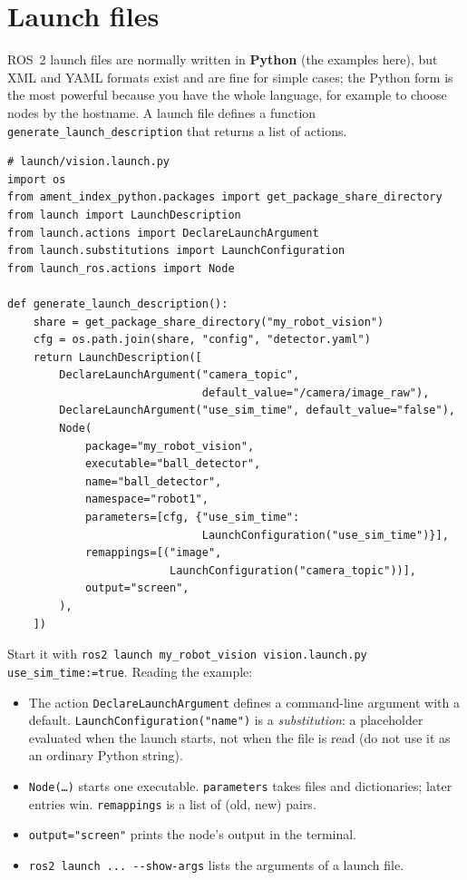 \section*{Launch files}
ROS~2 launch files are normally written in \textbf{Python} (the examples here), but XML and YAML formats exist and are fine for simple cases; the Python form is the most powerful because you have the whole language, for example to choose nodes by the hostname. A launch file defines a function \verb!generate_launch_description! that returns a list of actions.
\begin{verbatim}
# launch/vision.launch.py
import os
from ament_index_python.packages import get_package_share_directory
from launch import LaunchDescription
from launch.actions import DeclareLaunchArgument
from launch.substitutions import LaunchConfiguration
from launch_ros.actions import Node

def generate_launch_description():
    share = get_package_share_directory("my_robot_vision")
    cfg = os.path.join(share, "config", "detector.yaml")
    return LaunchDescription([
        DeclareLaunchArgument("camera_topic",
                              default_value="/camera/image_raw"),
        DeclareLaunchArgument("use_sim_time", default_value="false"),
        Node(
            package="my_robot_vision",
            executable="ball_detector",
            name="ball_detector",
            namespace="robot1",
            parameters=[cfg, {"use_sim_time":
                              LaunchConfiguration("use_sim_time")}],
            remappings=[("image",
                         LaunchConfiguration("camera_topic"))],
            output="screen",
        ),
    ])
\end{verbatim}
Start it with \verb!ros2 launch my_robot_vision vision.launch.py use_sim_time:=true!. Reading the example:
\begin{itemize}[nosep]
\item The action \verb!DeclareLaunchArgument! defines a command-line argument with a default. \verb!LaunchConfiguration("name")! is a \emph{substitution}: a placeholder evaluated when the launch starts, not when the file is read (do not use it as an ordinary Python string).
\item \texttt{Node(\ldots)} starts one executable. \verb!parameters! takes files and dictionaries; later entries win. \verb!remappings! is a list of (old, new) pairs.
\item \verb!output="screen"! prints the node's output in the terminal.
\item \verb!ros2 launch ... --show-args! lists the arguments of a launch file.
\end{itemize}
